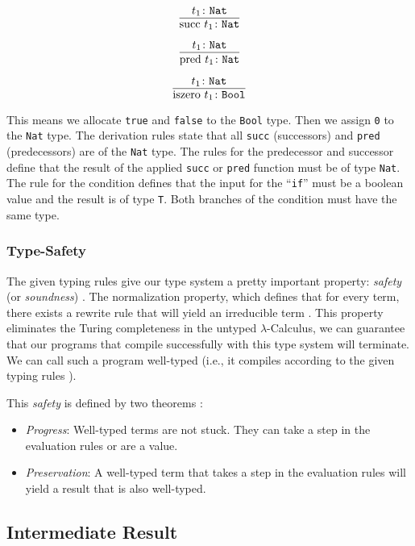 \[\infer{ \text{succ } t_1 \colon \texttt{Nat} }{ t_1 \colon \texttt{Nat} }\]

\[\infer{ \text{pred } t_1 \colon \texttt{Nat} }{ t_1 \colon \texttt{Nat} }\]

\[\infer{ \text{iszero } t_1 \colon \texttt{Bool} }{ t_1 \colon \texttt{Nat} }\]

This means we allocate \texttt{true} and \texttt{false} to the \texttt{Bool} type.
Then we assign \texttt{0} to the \texttt{Nat} type. 
The derivation rules state that all \texttt{succ} (successors) and \texttt{pred} (predecessors) are of the
\texttt{Nat} type. The rules for the predecessor and successor define that the result
of the applied \texttt{succ} or \texttt{pred} function must be of type \texttt{Nat}. The rule for the condition
defines that the input for the ``\texttt{if}'' must be a boolean value and the result is
of type \texttt{T}. Both branches of the condition must have the same type.

\subsubsection{Type-Safety}

The given typing rules give our type system a pretty important property:
\textit{safety} (or \textit{soundness}) \cite{pierce2002ProgLang}.
The normalization property, which defines that for every term, there exists a rewrite rule that will
yield an irreducible term \cite{pierce2002ProgLang,baader_nipkow_1998}.
This property eliminates the Turing completeness in the untyped $\lambda$-Calculus, 
we can guarantee that our programs
that compile successfully with this type system will terminate. We can call
such a program well-typed (i.e., it compiles according to the given typing rules \cite{cardelliTypeSystems}).

This \textit{safety} is defined by two theorems \cite{pierce2002ProgLang}:
\begin{itemize}
    \item \textit{Progress}: Well-typed terms are not stuck. They can take
          a step in the evaluation rules or are a value.
    \item \textit{Preservation}: A well-typed term that takes a step in the evaluation rules
          will yield a result that is also well-typed.
\end{itemize}

\subsection{Intermediate Result}

